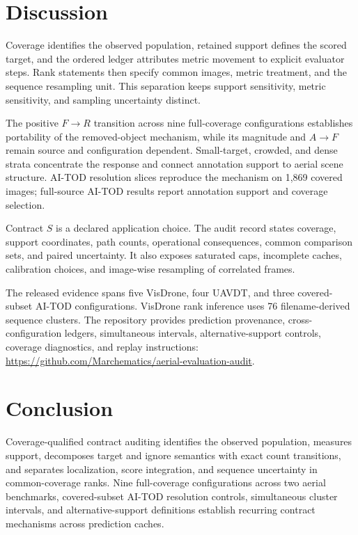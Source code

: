 \documentclass[journal]{IEEEtran}
\begin{document}
\balance
\section{Discussion}
Coverage identifies the observed population, retained support defines the scored target, and the ordered ledger attributes metric movement to explicit evaluator steps. Rank statements then specify common images, metric treatment, and the sequence resampling unit. This separation keeps support sensitivity, metric sensitivity, and sampling uncertainty distinct.

The positive $F\!\rightarrow\!R$ transition across nine full-coverage configurations establishes portability of the removed-object mechanism, while its magnitude and $A\!\rightarrow\!F$ remain source and configuration dependent. Small-target, crowded, and dense strata concentrate the response and connect annotation support to aerial scene structure. AI-TOD resolution slices reproduce the mechanism on 1,869 covered images; full-source AI-TOD results report annotation support and coverage selection.

Contract $S$ is a declared application choice. The audit record states coverage, support coordinates, path counts, operational consequences, common comparison sets, and paired uncertainty. It also exposes saturated caps, incomplete caches, calibration choices, and image-wise resampling of correlated frames.

The released evidence spans five VisDrone, four UAVDT, and three covered-subset AI-TOD configurations. VisDrone rank inference uses 76 filename-derived sequence clusters. The repository provides prediction provenance, cross-configuration ledgers, simultaneous intervals, alternative-support controls, coverage diagnostics, and replay instructions: \url{https://github.com/Marchematics/aerial-evaluation-audit}.

\section{Conclusion}
Coverage-qualified contract auditing identifies the observed population, measures support, decomposes target and ignore semantics with exact count transitions, and separates localization, score integration, and sequence uncertainty in common-coverage ranks. Nine full-coverage configurations across two aerial benchmarks, covered-subset AI-TOD resolution controls, simultaneous cluster intervals, and alternative-support definitions establish recurring contract mechanisms across prediction caches.


\end{document}
